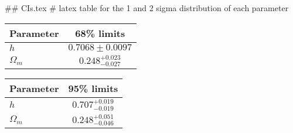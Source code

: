 ## CIs.tex
# latex table for the 1 and 2 sigma distribution of each parameter

\begin{tabular} { l  c}
 Parameter &  68\% limits\\
\hline
{\boldmath$h              $} & $0.7068\pm 0.0097          $\\
{\boldmath$\Omega_m       $} & $0.248^{+0.023}_{-0.027}   $\\
\hline
\end{tabular}

\begin{tabular} { l  c}
 Parameter &  95\% limits\\
\hline
{\boldmath$h              $} & $0.707^{+0.019}_{-0.019}   $\\
{\boldmath$\Omega_m       $} & $0.248^{+0.051}_{-0.046}   $\\
\hline
\end{tabular}
